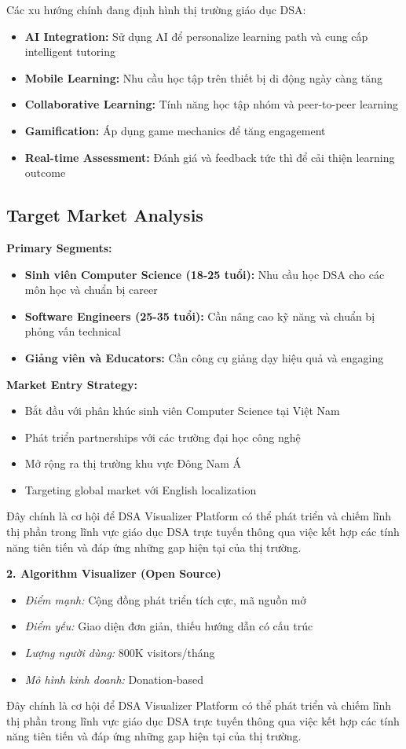 Các xu hướng chính đang định hình thị trường giáo dục DSA:
\begin{itemize}
\item \textbf{AI Integration:} Sử dụng AI để personalize learning path và cung cấp intelligent tutoring
\item \textbf{Mobile Learning:} Nhu cầu học tập trên thiết bị di động ngày càng tăng
\item \textbf{Collaborative Learning:} Tính năng học tập nhóm và peer-to-peer learning
\item \textbf{Gamification:} Áp dụng game mechanics để tăng engagement
\item \textbf{Real-time Assessment:} Đánh giá và feedback tức thì để cải thiện learning outcome
\end{itemize}

\subsection{Target Market Analysis}
\label{subsec:target-market}

\textbf{Primary Segments:}
\begin{itemize}
\item \textbf{Sinh viên Computer Science (18-25 tuổi):} Nhu cầu học DSA cho các môn học và chuẩn bị career
\item \textbf{Software Engineers (25-35 tuổi):} Cần nâng cao kỹ năng và chuẩn bị phỏng vấn technical
\item \textbf{Giảng viên và Educators:} Cần công cụ giảng dạy hiệu quả và engaging
\end{itemize}

\textbf{Market Entry Strategy:}
\begin{itemize}
\item Bắt đầu với phân khúc sinh viên Computer Science tại Việt Nam
\item Phát triển partnerships với các trường đại học công nghệ
\item Mở rộng ra thị trường khu vực Đông Nam Á
\item Targeting global market với English localization
\end{itemize}

Đây chính là cơ hội để DSA Visualizer Platform có thể phát triển và chiếm lĩnh thị phần trong lĩnh vực giáo dục DSA trực tuyến thông qua việc kết hợp các tính năng tiên tiến và đáp ứng những gap hiện tại của thị trường.

\textbf{2. Algorithm Visualizer (Open Source)}
\begin{itemize}
\item \textit{Điểm mạnh:} Cộng đồng phát triển tích cực, mã nguồn mở
\item \textit{Điểm yếu:} Giao diện đơn giản, thiếu hướng dẫn có cấu trúc
\item \textit{Lượng người dùng:} 800K visitors/tháng
\item \textit{Mô hình kinh doanh:} Donation-based
\end{itemize}

Đây chính là cơ hội để DSA Visualizer Platform có thể phát triển và chiếm lĩnh thị phần trong lĩnh vực giáo dục DSA trực tuyến thông qua việc kết hợp các tính năng tiên tiến và đáp ứng những gap hiện tại của thị trường.
